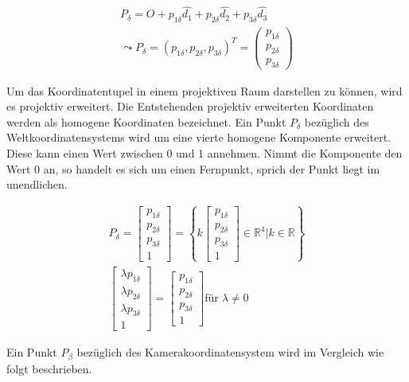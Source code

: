 	
	\begin{gather}
	P_\delta = O + p_{1\delta}\hat{d_1} + p_{2\delta}\hat{d_2} + p_{3\delta}\hat{d_3}\\
	\leadsto P_\delta = (p_{1\delta},p_{2\delta},p_{3\delta})^T = \begin{pmatrix} p_{1\delta} \\ p_{2\delta} \\ p_{3\delta} \end{pmatrix}
	\end{gather}
	
Um das Koordinatentupel in einem projektiven Raum darstellen zu können, wird es projektiv erweitert. Die Entstehenden projektiv erweiterten Koordinaten werden als homogene Koordinaten bezeichnet. Ein Punkt $P_\delta$ bezüglich des Weltkoordinatensystems wird um eine vierte homogene Komponente erweitert. Diese kann einen Wert zwischen 0 und 1 annehmen. Nimmt die Komponente den Wert 0 an, so handelt es sich um einen Fernpunkt, sprich der Punkt liegt im unendlichen.
	
	\begin{gather}
	P_\delta = \begin{bmatrix} p_{1\delta} \\ p_{2\delta} \\ p_{3\delta} \\1 \end{bmatrix} = \left\{ k \begin{bmatrix} p_{1\delta}\\p_{2\delta}\\p_{3\delta}\\1 \end{bmatrix} \in \mathbb{R} ^4 |  k \in \mathbb{R}\right\}\\
	\begin{bmatrix}\lambda p_{1\delta}\\ \lambda p_{2\delta} \\ \lambda p_{3\delta} \\ 1 \end{bmatrix} = \begin{bmatrix}p_{1\delta} \\ p_{2\delta} \\ p_{3\delta} \\ 1\end{bmatrix} \text{für} \; \lambda \ne 0
	\end{gather}


Ein Punkt $P_\beta$ bezüglich des Kamerakoordinatensystem wird im Vergleich wie folgt beschrieben.
	
